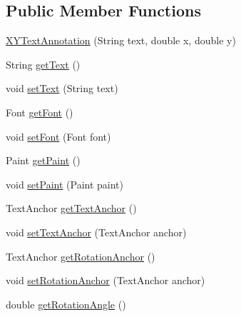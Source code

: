 \subsection*{Public Member Functions}
\begin{DoxyCompactItemize}
\item 
\mbox{\hyperlink{classorg_1_1jfree_1_1chart_1_1annotations_1_1_x_y_text_annotation_a730a8f0304e5b617c3a3be6551c03b56}{X\+Y\+Text\+Annotation}} (String text, double x, double y)
\item 
String \mbox{\hyperlink{classorg_1_1jfree_1_1chart_1_1annotations_1_1_x_y_text_annotation_a514ee0839698db4814f9c2c547e933b7}{get\+Text}} ()
\item 
void \mbox{\hyperlink{classorg_1_1jfree_1_1chart_1_1annotations_1_1_x_y_text_annotation_af3608173d547a1126eed296b66a645fc}{set\+Text}} (String text)
\item 
Font \mbox{\hyperlink{classorg_1_1jfree_1_1chart_1_1annotations_1_1_x_y_text_annotation_a5db5176b7e4eca80d7d54179953d5250}{get\+Font}} ()
\item 
void \mbox{\hyperlink{classorg_1_1jfree_1_1chart_1_1annotations_1_1_x_y_text_annotation_a256be6c8fcc2c4804f71bcd3633326b0}{set\+Font}} (Font font)
\item 
Paint \mbox{\hyperlink{classorg_1_1jfree_1_1chart_1_1annotations_1_1_x_y_text_annotation_a371cab8abb30565c9d1d35b322eceb86}{get\+Paint}} ()
\item 
void \mbox{\hyperlink{classorg_1_1jfree_1_1chart_1_1annotations_1_1_x_y_text_annotation_a813998d3f4ba3c498c21540d35ac5826}{set\+Paint}} (Paint paint)
\item 
Text\+Anchor \mbox{\hyperlink{classorg_1_1jfree_1_1chart_1_1annotations_1_1_x_y_text_annotation_a16ea6d9986cc6a441441edb006bc6347}{get\+Text\+Anchor}} ()
\item 
void \mbox{\hyperlink{classorg_1_1jfree_1_1chart_1_1annotations_1_1_x_y_text_annotation_a8f94034b11e63a57a792df1c26c03436}{set\+Text\+Anchor}} (Text\+Anchor anchor)
\item 
Text\+Anchor \mbox{\hyperlink{classorg_1_1jfree_1_1chart_1_1annotations_1_1_x_y_text_annotation_acb3aaa58e15cdca9253e36b3a35217fd}{get\+Rotation\+Anchor}} ()
\item 
void \mbox{\hyperlink{classorg_1_1jfree_1_1chart_1_1annotations_1_1_x_y_text_annotation_a7590b489d1fdc04821f4c847ed4eec8d}{set\+Rotation\+Anchor}} (Text\+Anchor anchor)
\item 
double \mbox{\hyperlink{classorg_1_1jfree_1_1chart_1_1annotations_1_1_x_y_text_annotation_ac62f67f0468e2a3dd09d380c5e1cfa9d}{get\+Rotation\+Angle}} ()

\end{DoxyCompactItemize}
